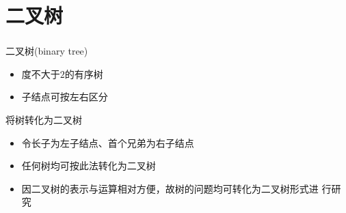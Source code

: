\section{二叉树}

\begin{fragile}
    \frametitle{\insertsectionhead}
    \begin{block}{二叉树(binary tree)}
        \begin{itemize}
            \item 度不大于$2$的有序树
            \item 子结点可按左右区分
        \end{itemize}
    \end{block}
    \begin{alertblock}{将树转化为二叉树}
        \begin{itemize}
            \item 令长子为左子结点、首个兄弟为右子结点
            \item 任何树均可按此法转化为二叉树
            \item 因二叉树的表示与运算相对方便，故树的问题均可转化为二叉树形式进
                  行研究
        \end{itemize}
    \end{alertblock}
\end{fragile}

